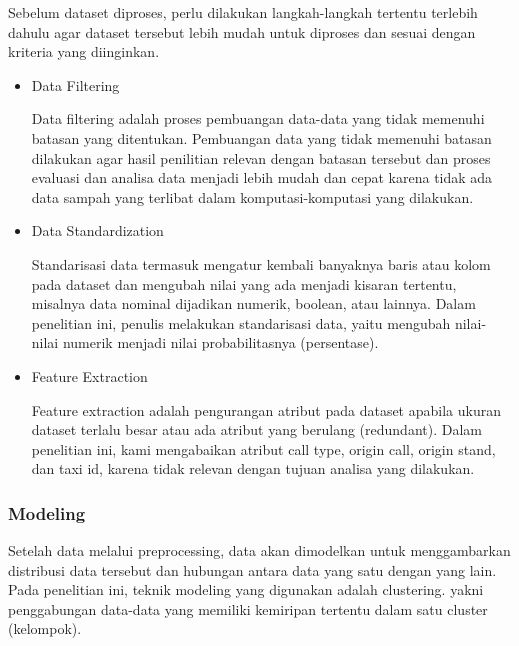 \documentclass{article}
\begin{document}
\begin{adjustwidth}{4em}{0pt}

\hspace{\parindent}Sebelum dataset diproses, perlu dilakukan langkah-langkah tertentu terlebih dahulu agar dataset tersebut lebih mudah untuk diproses dan sesuai dengan kriteria yang diinginkan.

\begin{itemize}
	\item{Data Filtering}
		
		Data filtering adalah proses pembuangan data-data yang tidak memenuhi batasan yang ditentukan. Pembuangan data yang tidak memenuhi batasan dilakukan agar hasil penilitian relevan dengan batasan tersebut dan proses evaluasi dan analisa data menjadi lebih mudah dan cepat karena tidak ada data sampah yang terlibat dalam komputasi-komputasi yang dilakukan.
		
	\item{Data Standardization}
		
		Standarisasi data termasuk mengatur kembali banyaknya baris atau kolom pada dataset dan mengubah nilai yang ada menjadi kisaran tertentu, misalnya data nominal dijadikan numerik, boolean, atau lainnya. Dalam penelitian ini, penulis melakukan standarisasi data, yaitu mengubah nilai-nilai numerik menjadi nilai probabilitasnya (persentase).
		
	\item{Feature Extraction}
		
		Feature extraction adalah pengurangan atribut pada dataset apabila ukuran dataset terlalu besar atau ada atribut yang berulang (redundant). Dalam penelitian ini, kami mengabaikan atribut call type, origin call, origin stand, dan taxi id, karena tidak relevan dengan tujuan analisa yang dilakukan.
		
\end{itemize}

\end{adjustwidth}

\subsubsection{Modeling}
\begin{adjustwidth}{4em}{0pt}
	
\hspace{\parindent}Setelah data melalui preprocessing, data akan dimodelkan untuk menggambarkan distribusi data tersebut dan hubungan antara data yang satu dengan yang lain. Pada penelitian ini, teknik modeling yang digunakan adalah clustering. yakni penggabungan data-data yang memiliki kemiripan tertentu dalam satu cluster (kelompok).

\end{adjustwidth}
\end{document}
